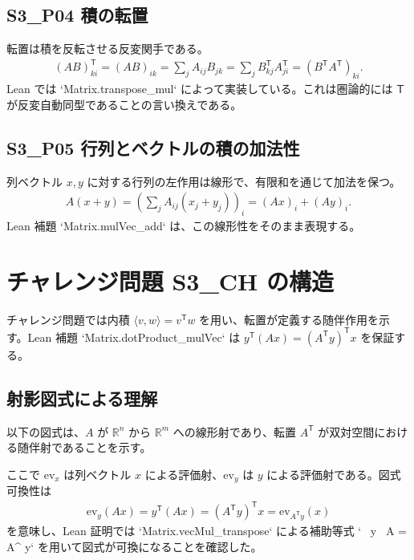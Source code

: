 \documentclass[12pt]{ltjsarticle}
\begin{document}
\subsection{S3\_P04 積の転置}
転置は積を反転させる反変関手である。
\begin{align*}
  (AB)^{\mathsf{T}}_{ki} = (AB)_{ik} = \sum_j A_{ij}B_{jk}
  = \sum_j B^{\mathsf{T}}_{kj} A^{\mathsf{T}}_{ji} = (B^{\mathsf{T}}A^{\mathsf{T}})_{ki}.
\end{align*}
Lean では `Matrix.transpose_mul` によって実装している。これは圏論的には $\mathsf{T}$ が反変自動同型であることの言い換えである。

\subsection{S3\_P05 行列とベクトルの積の加法性}
列ベクトル $x,y$ に対する行列の左作用は線形で、有限和を通じて加法を保つ。
\begin{align*}
  A(x+y) = \left(\sum_j A_{ij}(x_j+y_j)\right)_i = (Ax)_i + (Ay)_i.
\end{align*}
Lean 補題 `Matrix.mulVec_add` は、この線形性をそのまま表現する。

\section{チャレンジ問題 S3\_CH の構造}
チャレンジ問題では内積 $\langle v,w\rangle = v^{\mathsf{T}}w$ を用い、転置が定義する随伴作用を示す。Lean 補題 `Matrix.dotProduct_mulVec` は $y^{\mathsf{T}}(Ax) = (A^{\mathsf{T}}y)^{\mathsf{T}}x$ を保証する。

\subsection{射影図式による理解}
以下の図式は、$A$ が $\mathbb{R}^n$ から $\mathbb{R}^m$ への線形射であり、転置 $A^{\mathsf{T}}$ が双対空間における随伴射であることを示す。
\begin{center}
\end{center}
ここで $\mathrm{ev}_x$ は列ベクトル $x$ による評価射、$\mathrm{ev}_y$ は $y$ による評価射である。図式可換性は
\begin{align*}
  \mathrm{ev}_y( A x ) = y^{\mathsf{T}}(Ax) = (A^{\mathsf{T}}y)^{\mathsf{T}} x = \mathrm{ev}_{A^{\mathsf{T}}y}(x)
\end{align*}
を意味し、Lean 証明では `Matrix.vecMul_transpose` による補助等式 ` \, y \, A = A^{} y` を用いて図式が可換になることを確認した。
\end{document}
